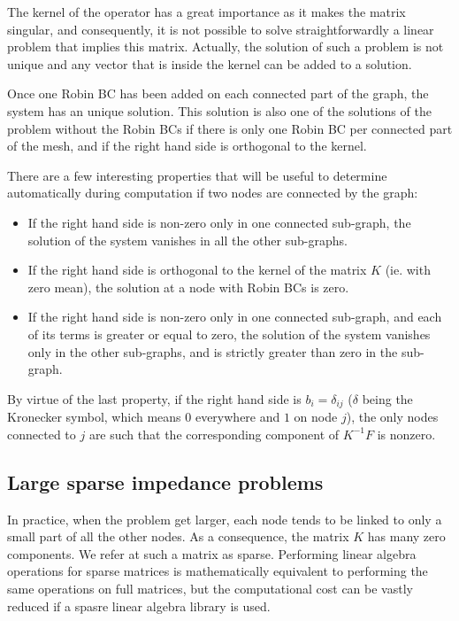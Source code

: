 \documentclass[11pt,a4paper]{article}		%
\begin{document}
The kernel of the operator has a great importance as it makes the matrix singular, and consequently, it is not possible to solve straightforwardly a linear problem that implies this matrix. Actually, the solution of such a problem is not unique and any vector that is inside the kernel can be added to a solution.

Once one Robin BC has been added on each connected part of the graph, the system has an unique solution. This solution is also one of the solutions of the problem without the Robin BCs if there is only one Robin BC per connected part of the mesh, and if the right hand side is orthogonal to the kernel.

There are a few interesting properties that will be useful to determine automatically during computation if two nodes are connected by the graph:

\begin{itemize}
	\item If the right hand side is non-zero only in one connected sub-graph, the solution of the system vanishes in all the other sub-graphs.
	\item If the right hand side is orthogonal to the kernel of the matrix $K$ (ie. with zero mean), the solution at a node with Robin BCs is zero.
	\item If the right hand side is non-zero only in one connected sub-graph, and each of its terms is greater or equal to zero, the solution of the system vanishes only in the other sub-graphs, and is strictly greater than zero in the sub-graph.
\end{itemize}

By virtue of the last property, if the right hand side is $b_i = \delta_{ij}$ ($\delta$ being the Kronecker symbol, which means $0$ everywhere and $1$ on node $j$), the only nodes connected to $j$ are such that the corresponding component of $K^{-1}F$ is nonzero.

\subsection{Large sparse impedance problems}

In practice, when the problem get larger, each node tends to be linked to only a small part of all the other nodes. As a consequence, the matrix $K$ has many zero components. We refer at such a matrix as sparse. Performing linear algebra operations for sparse matrices is mathematically equivalent to performing the same operations on full matrices, but the computational cost can be vastly reduced if a spasre linear algebra library is used.
\end{document}
